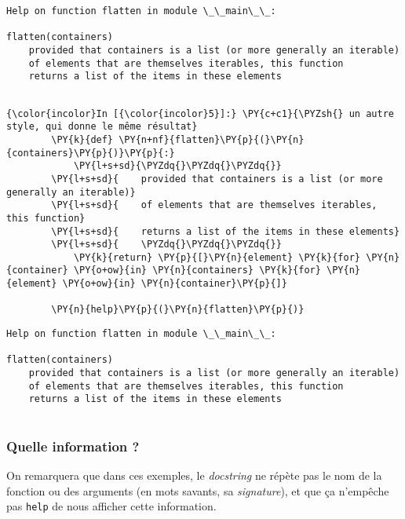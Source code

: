     \begin{Verbatim}[commandchars=\\\{\}]
Help on function flatten in module \_\_main\_\_:

flatten(containers)
    provided that containers is a list (or more generally an iterable)
    of elements that are themselves iterables, this function
    returns a list of the items in these elements


    \end{Verbatim}

    \begin{Verbatim}[commandchars=\\\{\}]
{\color{incolor}In [{\color{incolor}5}]:} \PY{c+c1}{\PYZsh{} un autre style, qui donne le même résultat}
        \PY{k}{def} \PY{n+nf}{flatten}\PY{p}{(}\PY{n}{containers}\PY{p}{)}\PY{p}{:}
            \PY{l+s+sd}{\PYZdq{}\PYZdq{}\PYZdq{}}
        \PY{l+s+sd}{    provided that containers is a list (or more generally an iterable)}
        \PY{l+s+sd}{    of elements that are themselves iterables, this function}
        \PY{l+s+sd}{    returns a list of the items in these elements}
        \PY{l+s+sd}{    \PYZdq{}\PYZdq{}\PYZdq{}}
            \PY{k}{return} \PY{p}{[}\PY{n}{element} \PY{k}{for} \PY{n}{container} \PY{o+ow}{in} \PY{n}{containers} \PY{k}{for} \PY{n}{element} \PY{o+ow}{in} \PY{n}{container}\PY{p}{]}
        
        \PY{n}{help}\PY{p}{(}\PY{n}{flatten}\PY{p}{)}
\end{Verbatim}


    \begin{Verbatim}[commandchars=\\\{\}]
Help on function flatten in module \_\_main\_\_:

flatten(containers)
    provided that containers is a list (or more generally an iterable)
    of elements that are themselves iterables, this function
    returns a list of the items in these elements


    \end{Verbatim}

    \hypertarget{quelle-information}{%
\subsubsection{Quelle information ?}\label{quelle-information}}

    On remarquera que dans ces exemples, le \emph{docstring} ne répète pas
le nom de la fonction ou des arguments (en mots savants, sa
\emph{signature}), et que ça n'empêche pas \texttt{help} de nous
afficher cette information.\\

